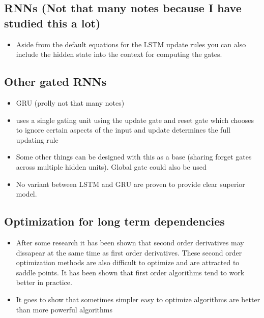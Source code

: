 \documentclass[11pt]{article}
\begin{document}
\subsection{RNNs (Not that many notes because I have studied this a lot)}
\label{sec:org863975f}
\begin{itemize}
\item Aside from the default equations for the LSTM update rules you can also include the hidden state into the context for computing the gates.
\end{itemize}
\subsection{Other gated RNNs}
\label{sec:org1851734}
\begin{itemize}
\item GRU (prolly not that many notes)
\item uses a single gating unit using the update gate and reset gate which chooses to ignore certain aspects of the input and update determines the full updating rule
\item Some other things can be designed with this as a base (sharing forget gates across multiple hidden units). Global gate could also be used
\item No variant between LSTM and GRU are proven to provide clear superior model.
\end{itemize}
\subsection{Optimization for long term dependencies}
\label{sec:orgacab88b}
\begin{itemize}
\item After some research it has been shown that second order derivatives may dissapear at the same time as first order derivatives. These second order optimization methods are also difficult to optimize and are attracted to saddle points. It has been shown that first order algorithms tend to work better in practice.
\item It goes to show that sometimes simpler easy to optimize algorithms are better than more powerful algorithms
\end{itemize}
\end{document}
